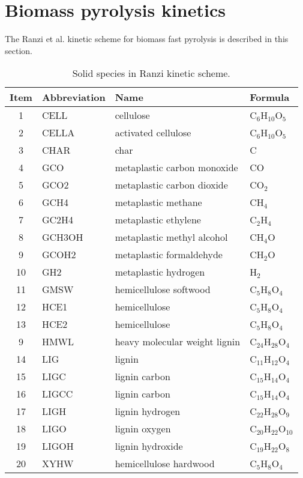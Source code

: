 
\section{Biomass pyrolysis kinetics}

The Ranzi et al. kinetic scheme for biomass fast pyrolysis is described in this section.

\begin{table}[H]
    \centering
    \caption{Solid species in Ranzi kinetic scheme.}
    \begin{tabular}{@{}clll@{}}
        \toprule
        Item & Abbreviation & Name & Formula \\
        \midrule
        1   & CELL      & cellulose                     & C$_6$H$_{10}$O$_5$ \\
        2   & CELLA     & activated cellulose           & C$_6$H$_{10}$O$_5$ \\
        3   & CHAR      & char                          & C \\
        4   & GCO       & metaplastic carbon monoxide   & CO \\
        5   & GCO2      & metaplastic carbon dioxide    & CO$_2$ \\
        6   & GCH4      & metaplastic methane           & CH$_4$ \\
        7   & GC2H4     & metaplastic ethylene          & C$_2$H$_4$ \\
        8   & GCH3OH    & metaplastic methyl alcohol    & CH$_4$O \\
        9   & GCOH2     & metaplastic formaldehyde      & CH$_2$O \\
        10  & GH2       & metaplastic hydrogen          & H$_2$ \\
        11  & GMSW      & hemicellulose softwood        & C$_5$H$_8$O$_4$ \\
        12  & HCE1      & hemicellulose                 & C$_5$H$_8$O$_4$ \\
        13  & HCE2      & hemicellulose                 & C$_5$H$_8$O$_4$ \\
        9   & HMWL      & heavy molecular weight lignin & C$_{24}$H$_{28}$O$_4$ \\
        14  & LIG       & lignin                        & C$_{11}$H$_{12}$O$_4$ \\
        15  & LIGC      & lignin carbon                 & C$_{15}$H$_{14}$O$_4$ \\
        16  & LIGCC     & lignin carbon                 & C$_{15}$H$_{14}$O$_4$ \\
        17  & LIGH      & lignin hydrogen               & C$_{22}$H$_{28}$O$_9$ \\
        18  & LIGO      & lignin oxygen                 & C$_{20}$H$_{22}$O$_{10}$ \\
        19  & LIGOH     & lignin hydroxide              & C$_{19}$H$_{22}$O$_8$ \\
        20  & XYHW      & hemicellulose hardwood        & C$_5$H$_8$O$_4$ \\
        \bottomrule
    \end{tabular}
\end{table}


